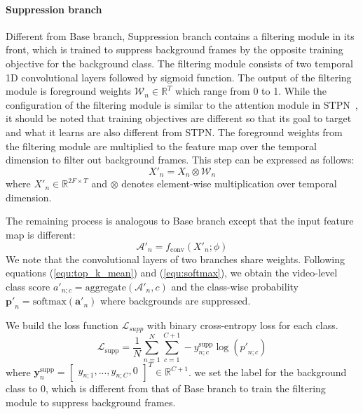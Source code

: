 \documentclass[letterpaper]{article} %
\newcommand{\R}{\mathbb{R}}
\begin{document}
\paragraph{Suppression branch}
Different from Base branch, Suppression branch contains a filtering module in its front, which is trained to suppress background frames by the opposite training objective for the background class. The filtering module consists of two temporal 1D convolutional layers followed by sigmoid function. The output of the filtering module is foreground weights $\mathcal{W}_{n}\in\R^{T}$ which range from 0 to 1. While the configuration of the filtering module is similar to the attention module in STPN~\cite{nguyen2018weakly}, it should be noted that training objectives are different so that its goal to target and what it learns are also different from STPN.
The foreground weights from the filtering module are multiplied to the feature map over the temporal dimension to filter out background frames. This step can be expressed as follows:
\begin{equation}
  \label{equ:filtering}
  {X'}_{n} = {X}_{n} \otimes \mathcal{W}_{n}
\end{equation}
where ${X'}_{n} \in \mathbb{R}^{2F \times T}$ and ${\otimes}$ denotes element-wise multiplication over temporal dimension.

The remaining process is analogous to Base branch except that the input feature map is different:
\begin{equation}
  \label{equ:filtered_cas}
  \mathcal{A'}_{n} = f_{\text{conv}}(X'_{n}; \phi)
\end{equation}
We note that the convolutional layers of two branches share weights. Following equations (\ref{equ:top_k_mean}) and (\ref{equ:softmax}), we obtain the video-level class score ${a'}_{n;c}=\text{aggregate}(\mathcal{A'}_{n}, c)$ and the class-wise probability $\mathbf{p'}_{n}=\text{softmax}(\mathbf{a'}_{n})$ where backgrounds are suppressed.

We build the loss function $\mathcal{L}_{supp}$ with binary cross-entropy loss for each class.
\begin{equation}
  \label{equ:loss_supp}
  \mathcal{L}_{\text{supp}} = \frac{1}{N}\sum_{n=1}^{N}\sum_{c=1}^{C+1}-y^{\text{supp}}_{n;c}\log({p'}_{n;c})
\end{equation}
where $\mathbf{y}^{\text{supp}}_{n} = \begin{bmatrix}y_{n;1}, ..., y_{n;C}, 0\end{bmatrix}^{T} \in \mathbb{R}^{C+1}$.
we set the label for the background class to $0$, which is different from that of Base branch to train the filtering module to suppress background frames.
\end{document}
